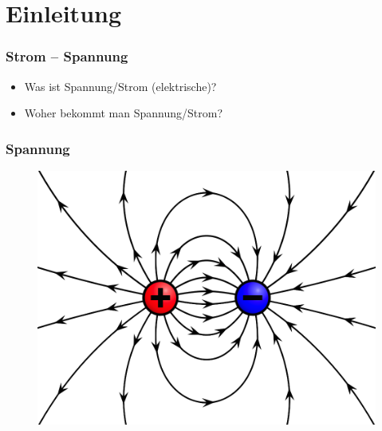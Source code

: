 

\subtitle{Technik 02: \\
          Spannung und Strom, Wechselspannung \\[2em]}
\date{Stand 27.10.2016}



\section*{Einleitung}

\begin{frame}
    \frametitle{Strom -- Spannung}
    \begin{itemize}
		\item Was ist Spannung/Strom (elektrische)?
		\item Woher bekommt man Spannung/Strom?
    \end{itemize}
\end{frame}

\begin{frame}
    \frametitle{Spannung}
    \begin{center}
      \begin{figure}
 	    \includegraphics[width=.6\textwidth,height=.75\textheight,keepaspectratio]{e02/ladung.png}      
      \end{figure}    
    \end{center}
\end{frame}


